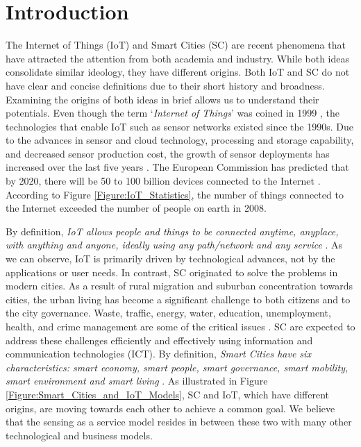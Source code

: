 \documentclass[times]{ettauth}
\begin{document}
\maketitle



\section{Introduction}
\label{sec:Introduction}

The Internet of Things (IoT) \cite{P001} and Smart Cities (SC) \cite{P532} are recent phenomena that have attracted the attention from both academia and industry. While both ideas consolidate similar ideology, they have different origins. Both IoT and SC do not have clear and concise definitions due to their short history and broadness. Examining the origins of both ideas in brief allows us to understand their potentials. Even though the term `\textit{Internet of Things}' was coined in 1999 \cite{P065}, the technologies that enable IoT such as sensor networks existed since the 1990s. Due to the advances in sensor and cloud technology, processing and storage capability, and decreased sensor production cost, the growth of sensor deployments has increased over the last five years \cite{ZMP003}. The European Commission has predicted that by 2020, there will be 50 to 100 billion devices connected to the Internet \cite{P029}. According to Figure \ref{Figure:IoT_Statistics}, the number of things connected to the Internet exceeded the number of people on earth in 2008.  

By definition, \textit{IoT allows people and things to be connected anytime, anyplace, with anything and anyone, ideally using any path/network and any service} \cite{P019}. As we can observe, IoT is primarily driven by technological advances, not by the applications or user needs. In contrast, SC \cite{P534} originated to solve the problems in modern cities. As a result of rural migration and suburban concentration towards cities, the urban living has become a significant challenge to both citizens and to the city governance. Waste, traffic, energy, water, education, unemployment, health, and crime management are some of the critical issues \cite{P535}. SC are expected to address these challenges efficiently and effectively using information and communication technologies (ICT). By definition, \textit{Smart Cities have six characteristics: smart economy, smart people, smart governance, smart mobility, smart environment and smart living} \cite{P528}. As illustrated in Figure \ref{Figure:Smart_Cities_and_IoT_Models}, SC and IoT, which have different origins, are moving towards each other to achieve a common goal. We believe that the sensing as a service model resides in between these two with many other technological and business models.
\end{document}
